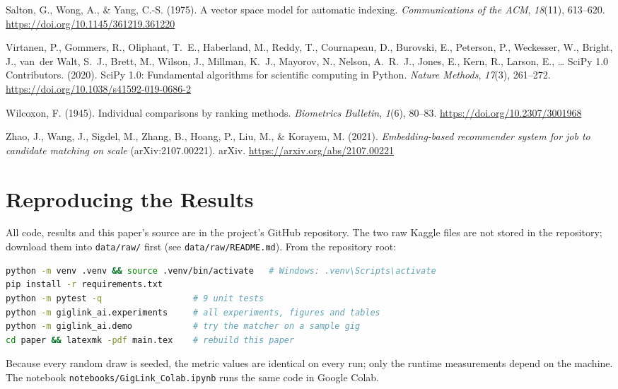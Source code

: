 \documentclass[12pt,a4paper]{article}
\numberwithin{equation}{section}
\theoremstyle{definition}
\theoremstyle{plain}
\begin{document}
\begin{thebibliography}{99}
Salton, G., Wong, A., \& Yang, C.-S. (1975). A vector space model for automatic indexing. \textit{Communications of the ACM}, \textit{18}(11), 613--620. \url{https://doi.org/10.1145/361219.361220}

Virtanen, P., Gommers, R., Oliphant, T.~E., Haberland, M., Reddy, T., Cournapeau, D., Burovski, E., Peterson, P., Weckesser, W., Bright, J., van~der Walt, S.~J., Brett, M., Wilson, J., Millman, K.~J., Mayorov, N., Nelson, A.~R.~J., Jones, E., Kern, R., Larson, E., \ldots{} SciPy 1.0 Contributors. (2020). SciPy 1.0: Fundamental algorithms for scientific computing in Python. \textit{Nature Methods}, \textit{17}(3), 261--272. \url{https://doi.org/10.1038/s41592-019-0686-2}

Wilcoxon, F. (1945). Individual comparisons by ranking methods. \textit{Biometrics Bulletin}, \textit{1}(6), 80--83. \url{https://doi.org/10.2307/3001968}

Zhao, J., Wang, J., Sigdel, M., Zhang, B., Hoang, P., Liu, M., \& Korayem, M. (2021). \textit{Embedding-based recommender system for job to candidate matching on scale} (arXiv:2107.00221). arXiv. \url{https://arxiv.org/abs/2107.00221}

\end{thebibliography}

\newpage
\appendix
\section{Reproducing the Results}\label{app:repro}
All code, results and this paper's source are in the project's GitHub repository. The two raw Kaggle files are not stored in the repository; download them \citep{upworkdata,resumedata} into \texttt{data/raw/} first (see \texttt{data/raw/README.md}). From the repository root:
\begin{lstlisting}[language=bash,numbers=none]
python -m venv .venv && source .venv/bin/activate   # Windows: .venv\Scripts\activate
pip install -r requirements.txt
python -m pytest -q                  # 9 unit tests
python -m giglink_ai.experiments     # all experiments, figures and tables
python -m giglink_ai.demo            # try the matcher on a sample gig
cd paper && latexmk -pdf main.tex    # rebuild this paper
\end{lstlisting}
Because every random draw is seeded, the metric values are identical on every run; only the runtime measurements depend on the machine. The notebook \texttt{notebooks/GigLink\_Colab.ipynb} runs the same code in Google Colab.
\end{document}
